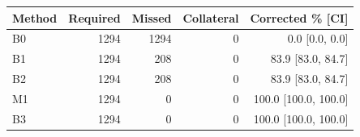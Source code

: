 \begin{tabular}{lrrrr}
\toprule
Method & Required & Missed & Collateral & Corrected \% [CI] \\
\midrule
B0 & 1294 & 1294 & 0 & 0.0 [0.0, 0.0] \\
B1 & 1294 & 208 & 0 & 83.9 [83.0, 84.7] \\
B2 & 1294 & 208 & 0 & 83.9 [83.0, 84.7] \\
M1 & 1294 & 0 & 0 & 100.0 [100.0, 100.0] \\
B3 & 1294 & 0 & 0 & 100.0 [100.0, 100.0] \\
\bottomrule
\end{tabular}
